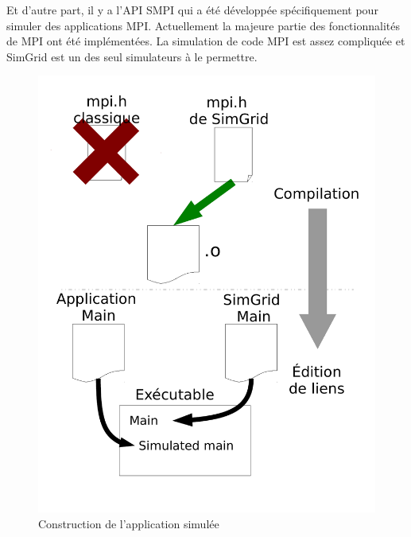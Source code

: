 \documentclass[smallextended]{svjour3}
\begin{document}
Et d'autre part, il y a l'API SMPI qui a été développée
spécifiquement pour simuler des applications MPI. Actuellement la
majeure partie des fonctionnalités de MPI ont été implémentées. La
simulation de code MPI est assez compliquée et SimGrid est un des
seul simulateurs à le permettre. 
\begin{figure}[htb]
  \centering
  \begin{minipage}{.45\linewidth}
    \includegraphics[width=\linewidth]{./Img/Compile.pdf}
    \caption{\label{fig:1}Construction de l'application simulée}
  \end{minipage}
  \begin{minipage}{.45\linewidth}

\end{minipage}
\end{figure}
\end{document}
